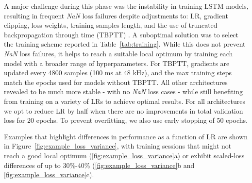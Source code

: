 A major challenge during this phase was the instability in training LSTM models, resulting in frequent \textit{NaN} loss failures despite adjustments to: LR, gradient clipping, loss weights, training samples length, and the use of truncated backpropagation through time (TBPTT) \citep{comunità2025nablafxframeworkdifferentiableblackbox}.
A suboptimal solution was to select the training scheme reported in Table~\ref{tab:training}. 
While this does not prevent \textit{NaN} loss failures, it helps to reach a suitable local optimum by training each model with a broader range of hyperparameters. 
For TBPTT, gradients are updated every 4800 samples (100 ms at 48 kHz), and the max training steps match the epochs used for models without TBPTT.
All other architectures revealed to be much more stable - with no \textit{NaN} loss cases - while still benefiting from training on a variety of LRs to achieve optimal results.
For all architectures we opt to reduce LR by half when there are no improvements in total validation loss for 20 epochs.
To prevent overfitting, we also use early stopping of 50 epochs.

Examples that highlight differences in performance as a function of LR are shown in Figure~\ref{fig:example_loss_variance}, with training sessions that might not reach a good local optimum (\ref{fig:example_loss_variance}a) or exhibit scaled-loss differences of up to 30\%-40\% (\ref{fig:example_loss_variance}b and \ref{fig:example_loss_variance}c).

